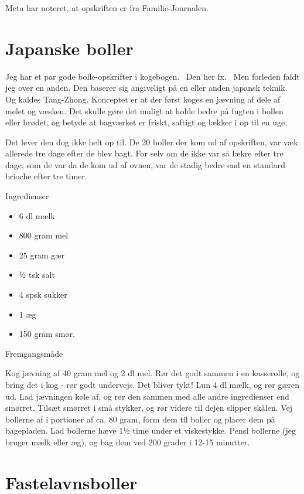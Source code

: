 \documentclass[
  letterpaper,
  DIV=11,
  numbers=noendperiod]{scrreprt}
\providecommand{\tightlist}{%
  \setlength{\itemsep}{0pt}\setlength{\parskip}{0pt}}\usepackage{longtable,booktabs,array}
\begin{document}
Meta har noteret, at opskriften er fra Familie-Journalen.

\hypertarget{japanske-boller}{%
\section{Japanske boller}\label{japanske-boller}}

Jeg har et par gode bolle-opskrifter i kogebogen.~ Den her fx. ~Men
forleden faldt jeg over en anden. Den baserer sig angiveligt på en eller
anden japansk teknik. Og kaldes Tang-Zhong. Konceptet er at der først
koges en jævning af dele af melet og væsken. Det skulle gøre det muligt
at holde bedre på fugten i bollen eller brødet, og betyde at bagværket
er friskt, saftigt og lækker i op til en uge.

Det lever den dog ikke helt op til. De 20 boller der kom ud af
opskriften, var væk allerede tre dage efter de blev bagt. For selv om de
ikke var så lækre efter tre dage, som de var da de kom ud af ovnen, var
de stadig bedre end en standard brioche efter tre timer.

Ingredienser

\begin{itemize}
\tightlist
\item
  6 dl mælk
\item
  800 gram mel
\item
  25 gram gær
\item
  ½ tsk salt
\item
  4 spsk sukker
\item
  1 æg
\item
  150 gram smør.
\end{itemize}

Fremgangsmåde

Kog jævning af 40 gram mel og 2 dl mel. Rør det godt sammen i en
kasserolle, og bring det i kog - rør godt undervejs. Det bliver tykt!
Lun 4 dl mælk, og rør gæren ud. Lad jævningen køle af, og rør den sammen
med alle andre ingredienser end smørret. Tilsæt smørret i små stykker,
og rør videre til dejen slipper skålen. Vej bollerne af i portioner af
ca. 80 gram, form dem til boller og placer dem på bagepladen. Lad
bollerne hæve 1½ time under et viskestykke. Pensl bollerne (jeg bruger
mælk eller æg), og bag dem ved 200 grader i 12-15 minutter.

\hypertarget{fastelavnsboller}{%
\section{Fastelavnsboller}\label{fastelavnsboller}}
\end{document}
